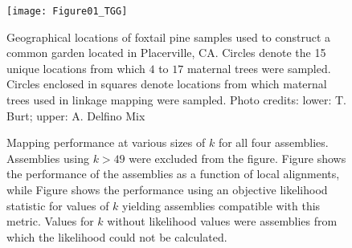 \documentclass[11pt]{article}
\begin{document}
\clearpage

\singlespacing



\clearpage

\begin{figure}[ht]
\centering
\texttt{[image: Figure01\_TGG]}
\caption{Geographical locations of foxtail pine samples used to construct a common garden located in Placerville, CA. Circles 
denote the 15 unique locations from which $4$ to $17$ maternal trees were sampled. Circles enclosed in squares denote 
locations from which maternal trees used in linkage mapping were sampled. Photo credits: lower: T. Burt; upper: A. Delfino Mix}
\label{f:Figure01_TGG}
\end{figure}

\begin{figure}[ht]
\centering
{}
\caption{Mapping performance at various sizes of $k$ for all four assemblies.  Assemblies using 
$k>49$ were excluded from the figure.  Figure  shows the performance of the assemblies as a 
function of local alignments, while Figure  shows the performance using an objective 
likelihood statistic for values of $k$ yielding assemblies compatible with this metric. Values for $k$ without 
likelihood values were assemblies from which the likelihood could not be calculated.}
\label{f:mapping_performance}
\end{figure}
\end{document}
